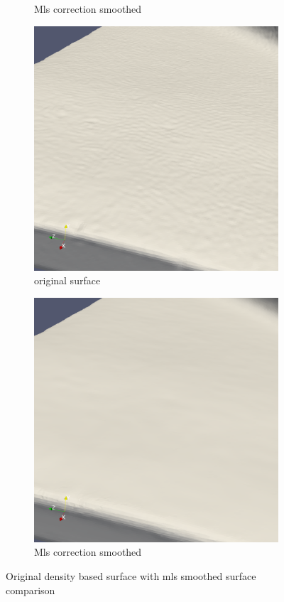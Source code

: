 \begin{figure}
\begin{center}
\begin{subfigure}[b]{0.47\textwidth}
			\caption{Mls correction smoothed}
		\end{subfigure}
		\begin{subfigure}[b]{0.47\textwidth}
			\includegraphics[width=\textwidth]{figures/DDMOriginal4.png}
			\caption{original surface}
		\end{subfigure}\begin{subfigure}[b]{0.47\textwidth}
			\includegraphics[width=\textwidth]{figures/DDMMls4.png}
			\caption{Mls correction smoothed}
		\end{subfigure}
	\end{center}
	\caption{Original density based surface with mls smoothed surface comparison} \label{fig:db_mls_reconstruction2}
\end{figure}
